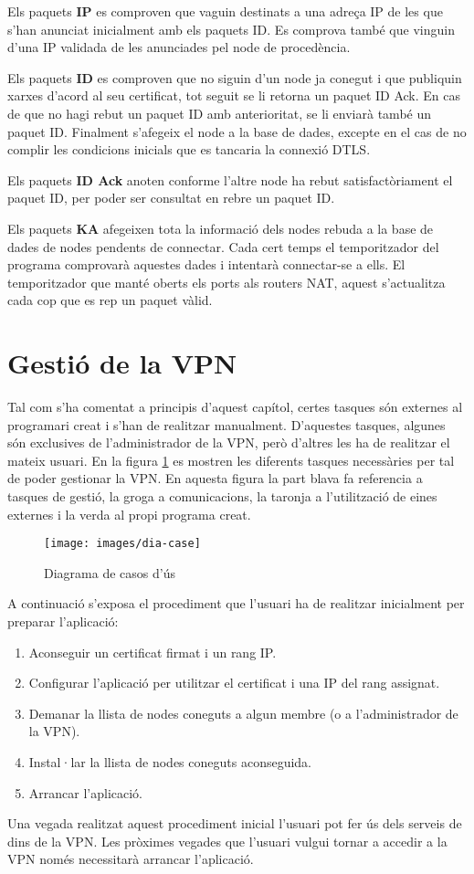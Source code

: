 Els paquets \textbf{IP} es comproven que vaguin destinats a una adreça IP de les que s'han anunciat inicialment amb els paquets ID. Es comprova també que vinguin d'una IP validada de les anunciades pel node de procedència. 

Els paquets \textbf{ID} es comproven que no siguin d'un node ja conegut i que publiquin xarxes d'acord al seu certificat, tot seguit se li retorna un paquet ID Ack. En cas de que no hagi rebut un paquet ID amb anterioritat, se li enviarà també un paquet ID. Finalment s'afegeix el node a la base de dades, excepte en el cas de no complir les condicions inicials que es tancaria la connexió DTLS.

Els paquets \textbf{ID Ack} anoten conforme l'altre node ha rebut satisfactòriament el paquet ID, per poder ser consultat en rebre un paquet ID.

Els paquets \textbf{KA} afegeixen tota la informació dels nodes rebuda a la base de dades de nodes pendents de connectar. Cada cert temps el temporitzador del programa comprovarà aquestes dades i intentarà connectar-se a ells. El temporitzador que manté oberts els ports als routers NAT, aquest s'actualitza cada cop que es rep un paquet vàlid.

\section{Gestió de la VPN}
Tal com s'ha comentat a principis d'aquest capítol, certes tasques són externes al programari creat i s'han de realitzar manualment. D'aquestes tasques, algunes són exclusives de l'administrador de la VPN, però d'altres les ha de realitzar el mateix usuari.
En la figura \ref{F:dia-case} es mostren les diferents tasques necessàries per tal de poder gestionar la VPN. En aquesta figura la part blava fa referencia a tasques de gestió, la groga a comunicacions, la taronja a l'utilització de eines externes i la verda al propi programa creat.
\begin{figure}[htb]
\centering
\texttt{[image: images/dia-case]}
\caption{Diagrama de casos d'ús}
\label{F:dia-case}
\end{figure}

A continuació s'exposa el procediment que l'usuari ha de realitzar inicialment per preparar l'aplicació:
\begin{enumerate}
\item Aconseguir un certificat firmat i un rang IP.
\item Configurar l'aplicació per utilitzar el certificat i una IP del rang assignat.
\item Demanar la llista de nodes coneguts a algun membre (o a l'administrador de la VPN).
\item Instal·lar la llista de nodes coneguts aconseguida.
\item Arrancar l'aplicació.
\end{enumerate}
Una vegada realitzat aquest procediment inicial l'usuari pot fer ús dels serveis de dins de la VPN. Les pròximes vegades que l'usuari vulgui tornar a accedir a la VPN només necessitarà arrancar l'aplicació.

